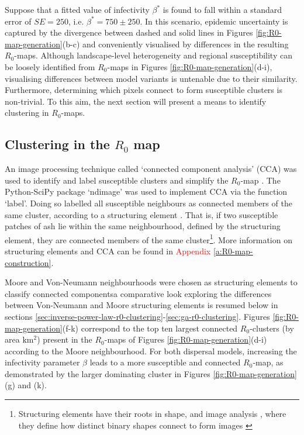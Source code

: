Suppose that a fitted value of infectivity $\beta^*$ is found to fall within a standard error of $SE=250$,  i.e. $\beta^* = 750 \pm 250$.
In this scenario, epidemic uncertainty is captured by the divergence between dashed and solid lines in Figures \ref{fig:R0-map-generation}(b-c)
and conveniently visualised by differences in the resulting $R_0$-maps.
Although landscape-level heterogeneity and regional susceptibility can be loosely identified from $R_0$-maps in Figures \ref{fig:R0-map-generation}(d-i),
visualising differences between model variants is untenable due to their similarity. 
Furthermore, determining which pixels connect to form susceptible clusters is non-trivial. 
To this aim, the next section will present a means to identify clustering in $R_0$-maps.

\subsection{Clustering in the $R_0$ map}
\label{sec:r0-clustering}

An image processing technique called `connected component analysis' (CCA) was used to identify and label susceptible clusters and simplify the $R_0$-map \cite{CCA1, CCA2} . 
The Python-SciPy package `ndimage' \cite{scipy} was used to implement CCA via the function `label'. 
Doing so labelled all susceptible neighbours as connected members of the same cluster, according to a structuring element \cite{liang1989erosion}. 
That is, if two susceptible patches of ash lie within the same neighbourhood, defined by the structuring element, they are connected members of the same cluster\footnote{Structuring elements have their roots in shape, and image analysis \cite{23111}, where they define how distinct binary shapes connect to form images \cite{liang1989erosion, nachtegael2001connections}}. 
More information on structuring elements and CCA can be found in \textcolor{red}{Appendix \ref{a:R0-map-construction}}. %

Moore and Von-Neumann neighbourhoods were chosen as structuring elements to classify connected components\textemdash a comparative look exploring the differences between Von-Neumann and Moore 
structuring elements is resumed below in sections \ref{sec:inverse-power-law-r0-clustering}-\ref{sec:ga-r0-clustering}.  
Figures \ref{fig:R0-map-generation}(f-k) correspond to the top ten largest connected $R_0$-clusters (by area $\mathrm{km^2}$) present in the $R_0$-maps of Figures \ref{fig:R0-map-generation}(d-i) according to the Moore neighbourhood.
For both dispersal models, increasing the infectivity parameter $\beta$ leads to a more susceptible and connected $R_0$-map, as demonstrated by the larger dominating cluster in Figures \ref{fig:R0-map-generation}(g) and (k).

